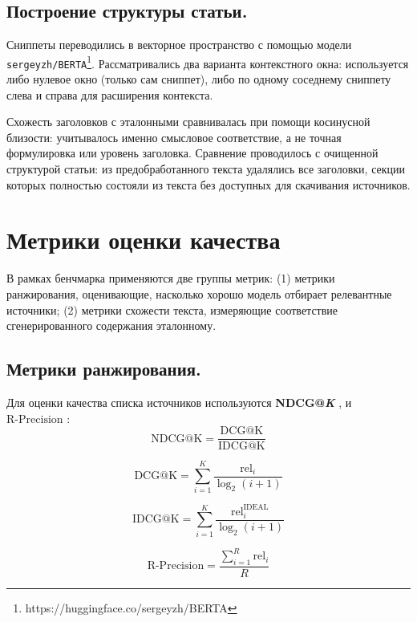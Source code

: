 \documentclass{article}
\begin{document}
\subsection*{Построение структуры статьи.}
Сниппеты переводились в векторное пространство с помощью модели \texttt{sergeyzh/BERTA}\footnote{https://huggingface.co/sergeyzh/BERTA}. 
Рассматривались два варианта контекстного окна: используется либо нулевое окно (только сам сниппет), либо по одному соседнему сниппету слева и справа для расширения контекста.  

Схожесть заголовков с эталонными сравнивалась при помощи косинусной близости: учитывалось именно смысловое соответствие, а не точная формулировка или уровень заголовка. 
Сравнение проводилось с очищенной структурой статьи: из предобработанного текста удалялись все заголовки, секции которых полностью состояли из текста без доступных для скачивания источников. 

\section*{Метрики оценки качества}

В рамках бенчмарка применяются две группы метрик:  
(1) метрики ранжирования, оценивающие, насколько хорошо модель отбирает релевантные источники;  
(2) метрики схожести текста, измеряющие соответствие сгенерированного содержания эталонному.

\subsection*{Метрики ранжирования.}

Для оценки качества списка источников используются \textbf{NDCG@\textit{K}} \cite{ndcg}, и $\mathrm{R\text{-}Precision}$ \cite{rprecision}:
\begin{equation}\label{ndcg}
\mathrm{NDCG@K}= \frac{\mathrm{DCG@K}}{\mathrm{IDCG@K}}
\end{equation}

\begin{equation}\label{dcg}
\mathrm{DCG@K}= \sum_{i=1}^{K} \frac{\mathrm{rel}_i}{\log_2(i+1)}
\end{equation}

\begin{equation}\label{idcg}
\mathrm{IDCG@K}= \sum_{i=1}^{K} \frac{\mathrm{rel}^{\mathrm{IDEAL}}_i}{\log_2(i+1)}
\end{equation}

\begin{equation}\label{rpr}
\mathrm{R\text{-}Precision}= \frac{\sum_{i=1}^{R} \mathrm{rel}_i}{R}
\end{equation}
\end{document}
